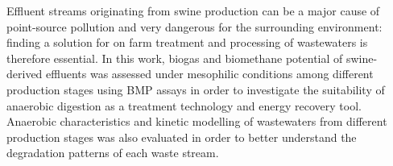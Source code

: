 Effluent streams originating from swine production can be a major cause of point-source pollution and very dangerous for the surrounding environment: finding a solution for on farm treatment and processing of wastewaters is therefore essential. In this work, biogas and biomethane potential of swine-derived effluents was assessed under mesophilic conditions among different production stages using BMP assays in order to investigate the suitability of anaerobic digestion as a treatment technology and energy recovery tool. Anaerobic characteristics and kinetic modelling of wastewaters from different production stages was also evaluated in order to better understand the degradation patterns of each waste stream.